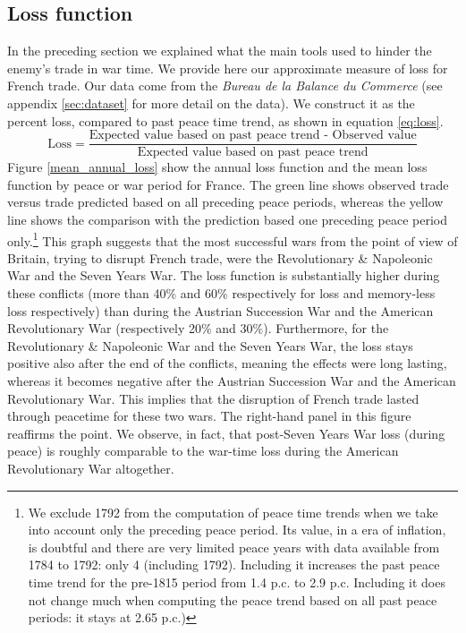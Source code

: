 \documentclass[12pt,a4paper,notitlepage,english]{article}
\begin{document}
\subsection{Loss function}
\label{sec:loss}
In the preceding section we explained what the main tools used to hinder the enemy's trade in war time. We provide here our approximate measure of loss for French trade. Our data come from the \textit{Bureau de la Balance du Commerce} (see appendix \ref{sec:dataset} for more detail on the data). We construct it as the percent loss, compared to past peace time trend, as shown in equation \ref{eq:loss}.
\begin{equation*}
\label{eq:loss}
\text{Loss} = \frac{\text{Expected value based on past peace trend - Observed value}}{\text{Expected value based on past peace trend}}
\end{equation*}
Figure \ref{mean_annual_loss} show the annual loss function and the mean loss function by peace or war period for France. 
The green line shows observed trade versus trade predicted based on all preceding peace periods, whereas the yellow line shows the comparison with the prediction based one preceding peace period only.\footnote{We exclude 1792 from the computation of peace time trends when we take into account only the preceding peace period. Its value, in a era of inflation, is doubtful and there are very limited peace years with data available from 1784 to 1792: only 4 (including 1792). Including it increases the past peace time trend for the pre-1815 period from 1.4 p.c. to 2.9 p.c. Including it does not change much when computing the peace trend based on all past peace periods: it stays at 2.65 p.c.)}
This graph suggests that the most successful wars from the point of view of Britain, trying to disrupt French trade, were the Revolutionary \& Napoleonic War and the Seven Years War.
The loss function is substantially higher during these conflicts (more than 40\% and 60\% respectively for loss and memory-less loss respectively) than during the Austrian Succession War and the American Revolutionary War (respectively 20\% and 30\%).
Furthermore, for the Revolutionary \& Napoleonic War and the Seven Years War, the loss stays positive also after the end of the conflicts, meaning the effects were long lasting, whereas it becomes negative after the Austrian Succession War and the American Revolutionary War. This implies that the disruption of French trade lasted through peacetime for these two wars. The right-hand panel in this figure reaffirms the point. We observe, in fact, that post-Seven Years War loss (during peace) is roughly comparable to the war-time loss during the American Revolutionary War altogether.
\end{document}
